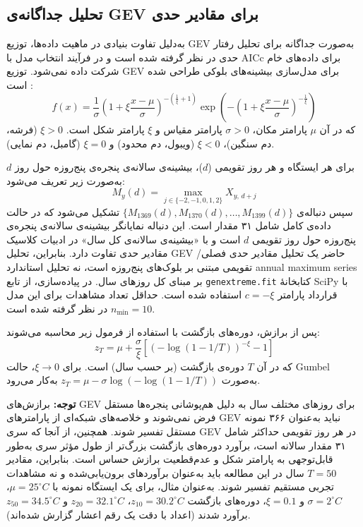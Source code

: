 \documentclass[12pt,a4paper,twocolumn]{article}
\begin{document}
\subsection{تحلیل جداگانه‌ی GEV برای مقادیر حدی}
به‌دلیل تفاوت بنیادی در ماهیت داده‌ها، توزیع GEV به‌صورت جداگانه برای تحلیل رفتار حدی در نظر گرفته شده است و در فرآیند انتخاب مدل با AICc برای داده‌های خام شرکت داده نمی‌شود. توزیع GEV برای مدل‌سازی بیشینه‌های بلوکی طراحی شده است \cite{coles2001}:
\begin{equation}
f(x) = \frac{1}{\sigma}\left( 1 + \xi\frac{x - \mu}{\sigma} \right)^{- \left( \frac{1}{\xi} + 1 \right)}\exp\left( - \left( 1 + \xi\frac{x - \mu}{\sigma} \right)^{- \frac{1}{\xi}} \right)
\end{equation}
که در آن $\mu$ پارامتر مکان، $\sigma>0$ پارامتر مقیاس و $\xi$ پارامتر شکل است. $\xi>0$ (فرشه، دم سنگین)، $\xi<0$ (ویبول، دم محدود) و $\xi=0$ (گامبل، دم نمایی).

برای هر ایستگاه و هر روز تقویمی ($d$)، بیشینه‌ی سالانه‌ی پنجره‌ی پنج‌روزه حول روز $d$ به‌صورت زیر تعریف می‌شود:
\begin{equation}
M_y(d) = \max_{j \in \{-2,-1,0,1,2\}} X_{y,\, d+j}
\end{equation}
سپس دنباله‌ی $\{M_{1369}(d), M_{1370}(d), \dots, M_{1399}(d)\}$ تشکیل می‌شود که در حالت داده‌ی کامل شامل ۳۱ مقدار است. این دنباله نمایانگر بیشینه‌ی سالانه‌ی پنجره‌ی پنج‌روزه حول روز تقویمی $d$ است و با «بیشینه‌ی سالانه‌ی کل سال» در ادبیات کلاسیک مقادیر حدی تفاوت دارد. بنابراین، تحلیل GEV حاضر یک تحلیل مقادیر حدی فصلی/تقویمی مبتنی بر بلوک‌های پنج‌روزه است، نه تحلیل استاندارد annual maximum series بر مبنای کل روزهای سال. در پیاده‌سازی، از تابع \texttt{genextreme.fit} کتابخانهٔ SciPy با قرارداد پارامتر $c=-\xi$ استفاده شده است. حداقل تعداد مشاهدات برای این مدل $n_{\min}=10$ در نظر گرفته شده است.

پس از برازش، دوره‌های بازگشت با استفاده از فرمول زیر محاسبه می‌شوند:
\begin{equation}
z_T = \mu + \frac{\sigma}{\xi}\left[ \left(-\log(1-1/T)\right)^{-\xi} - 1 \right]
\end{equation}
که در آن $T$ دوره‌ی بازگشت (بر حسب سال) است. برای $\xi \to 0$، حالت Gumbel به‌صورت $z_T = \mu - \sigma \log(-\log(1-1/T))$ به‌کار می‌رود.

\textbf{توجه:} برازش‌های GEV برای روزهای مختلف سال به دلیل هم‌پوشانی پنجره‌ها مستقل فرض نمی‌شوند و خلاصه‌های شبکه‌ای از پارامترهای GEV نباید به‌عنوان ۳۶۶ نمونه مستقل تفسیر شوند. همچنین، از آنجا که سری GEV در هر روز تقویمی حداکثر شامل ۳۱ مقدار سالانه است، برآورد دوره‌های بازگشت بزرگ‌تر از طول مؤثر سری به‌طور قابل‌توجهی به پارامتر شکل و عدم‌قطعیت برازش حساس است. بنابراین، مقادیر $T=50$ سال در این مطالعه باید به‌عنوان برآوردهای برون‌یابی‌شده و نه مشاهدات تجربی مستقیم تفسیر شوند. به‌عنوان مثال، برای یک ایستگاه نمونه با $\mu=25^\circ C$، $\sigma=2^\circ C$ و $\xi=0.1$، دوره‌های بازگشت $z_{10}=30.2^\circ C$، $z_{20}=32.1^\circ C$ و $z_{50}=34.5^\circ C$ برآورد شدند (اعداد با دقت یک رقم اعشار گزارش شده‌اند).
\end{document}
